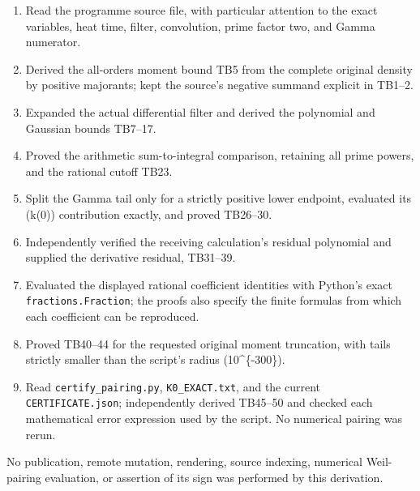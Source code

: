 \documentclass[
]{article}
\providecommand{\tightlist}{%
  \setlength{\itemsep}{0pt}\setlength{\parskip}{0pt}}
\begin{document}
\begin{enumerate}
\def\labelenumi{\arabic{enumi}.}
\tightlist
\item
  Read the programme source file, with particular attention to the exact
  variables, heat time, filter, convolution, prime factor two, and Gamma
  numerator.
\item
  Derived the all-orders moment bound TB5 from the complete original
  density by positive majorants; kept the source's negative summand
  explicit in TB1--2.
\item
  Expanded the actual differential filter and derived the polynomial and
  Gaussian bounds TB7--17.
\item
  Proved the arithmetic sum-to-integral comparison, retaining all prime
  powers, and the rational cutoff TB23.
\item
  Split the Gamma tail only for a strictly positive lower endpoint,
  evaluated its (k(0)) contribution exactly, and proved TB26--30.
\item
  Independently verified the receiving calculation's residual polynomial
  and supplied the derivative residual, TB31--39.
\item
  Evaluated the displayed rational coefficient identities with Python's
  exact \texttt{fractions.Fraction}; the proofs also specify the finite
  formulas from which each coefficient can be reproduced.
\item
  Proved TB40--44 for the requested original moment truncation, with
  tails strictly smaller than the script's radius (10\^{}\{-300\}).
\item
  Read \texttt{certify\_pairing.py}, \texttt{K0\_EXACT.txt}, and the
  current \texttt{CERTIFICATE.json}; independently derived TB45--50 and
  checked each mathematical error expression used by the script. No
  numerical pairing was rerun.
\end{enumerate}

No publication, remote mutation, rendering, source indexing, numerical
Weil-pairing evaluation, or assertion of its sign was performed by this
derivation.
\end{document}
